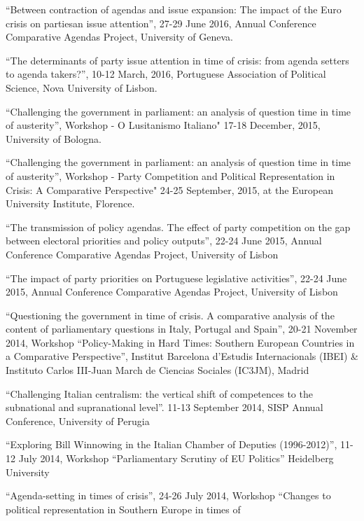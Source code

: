 \documentclass[11pt,]{article}
\renewenvironment{itemize}{
  \begin{list}{}{
    \setlength{\leftmargin}{1.5em}
  }
}{
  \end{list}
}
\begin{document}
\begin{itemize}
\item
  ``Between contraction of agendas and issue expansion: The impact of
  the Euro crisis on partiesan issue attention'', 27-29 June 2016,
  Annual Conference Comparative Agendas Project, University of Geneva.
\item
  ``The determinants of party issue attention in time of crisis: from
  agenda setters to agenda takers?'', 10-12 March, 2016, Portuguese
  Association of Political Science, Nova University of Lisbon.
\item
  ``Challenging the government in parliament: an analysis of question
  time in time of austerity'', Workshop - O Lusitanismo Italiano" 17-18
  December, 2015, University of Bologna.
\item
  ``Challenging the government in parliament: an analysis of question
  time in time of austerity'', Workshop - Party Competition and
  Political Representation in Crisis: A Comparative Perspective" 24-25
  September, 2015, at the European University Institute, Florence.
\item
  ``The transmission of policy agendas. The effect of party competition
  on the gap between electoral priorities and policy outputs'', 22-24
  June 2015, Annual Conference Comparative Agendas Project, University
  of Lisbon
\item
  ``The impact of party priorities on Portuguese legislative
  activities'', 22-24 June 2015, Annual Conference Comparative Agendas
  Project, University of Lisbon
\item
  ``Questioning the government in time of crisis. A comparative analysis
  of the content of parliamentary questions in Italy, Portugal and
  Spain'', 20-21 November 2014, Workshop ``Policy-Making in Hard Times:
  Southern European Countries in a Comparative Perspective'', Institut
  Barcelona d'Estudis Internacionals (IBEI) \& Instituto Carlos III-Juan
  March de Ciencias Sociales (IC3JM), Madrid
\item
  ``Challenging Italian centralism: the vertical shift of competences to
  the subnational and supranational level''. 11-13 September 2014, SISP
  Annual Conference, University of Perugia
\item
  ``Exploring Bill Winnowing in the Italian Chamber of Deputies
  (1996-2012)'', 11-12 July 2014, Workshop ``Parliamentary Scrutiny of
  EU Politics'' Heidelberg University
\item
  ``Agenda-setting in times of crisis'', 24-26 July 2014, Workshop
  ``Changes to political representation in Southern Europe in times of

\end{itemize}
\end{document}
